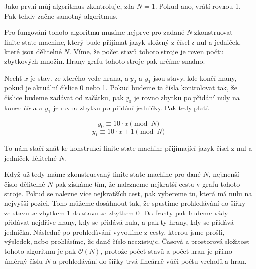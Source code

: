 \documentclass{fkssolpub}
\author{Ondřej Sedláček}
\begin{document}
Jako první můj algoritmus zkontroluje, zda $N = 1$. Pokud ano, vrátí rovnou 1. Pak tehdy začne samotný algoritmus.

Pro fungování tohoto algoritmu musíme nejprve pro zadané $N$ zkonstruovat finite-state machine, který bude přijímat jazyk složený z čísel z nul a jedniček, které jsou dělitelné $N$. Víme, že počet stavů tohoto stroje je roven počtu zbytkových množin. Hrany grafu tohoto stroje pak určíme snadno.

Nechť $x$ je stav, ze kterého vede hrana, a $y_0$ a $y_1$ jsou stavy, kde končí hrany, pokud je aktuální číslice 0 nebo 1. Pokud budeme ta čísla kontrolovat tak, že číslice budeme zadávat od začátku, pak $y_0$ je rovno zbytku po přidání nuly na konec čísla a $y_1$ je rovno zbytku po přidání jedničky. Pak tedy platí:

\[
	y_0 \equiv 10 \cdot x \pmod{N}
\]
\[
	y_1 \equiv 10 \cdot x + 1 \pmod{N}
\]

To nám stačí znát ke konstrukci finite-state machine přijímající jazyk čísel z nul a jedniček dělitelné $N$.

Když už tedy máme zkonstruovaný finite-state machine pro dané $N$, nejmenší číslo dělitelné $N$ pak získáme tím, že nalezneme nejkratší cestu v grafu tohoto stroje. Pokud se nalezne více nejkratších cest, pak vybereme tu, která má nulu na nejvyšší pozici. Toho můžeme dosáhnout tak, že spustíme prohledávání do šířky ze stavu se zbytkem 1 do stavu se zbytkem 0. Do fronty pak budeme vždy přidávat nejdříve hrany, kdy se přidává nula, a pak ty hrany, kdy se přidává jednička. Následně po prohledávání vyvodíme z cesty, kterou jsme prošli, výsledek, nebo prohlásíme, že dané číslo neexistuje. Časová a prostorová složitost tohoto algoritmu je pak $\mathcal{O}(N)$, protože počet stavů a počet hran je přímo úměrný číslu $N$ a prohledávání do šířky trvá lineárně vůči počtu vrcholů a hran.
\end{document}
